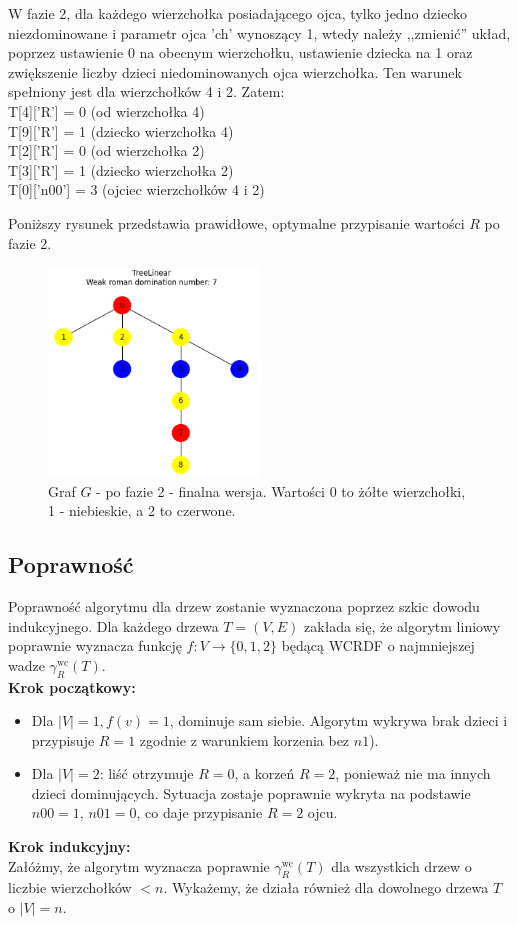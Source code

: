 W fazie 2, dla każdego wierzchołka posiadającego ojca, tylko jedno dziecko niezdominowane i parametr ojca 'ch' wynoszący 1, wtedy należy ,,zmienić'' układ, poprzez ustawienie 0 na obecnym wierzchołku, ustawienie dziecka na 1 oraz zwiększenie liczby dzieci niedominowanych ojca wierzchołka. 
Ten warunek spełniony jest dla wierzchołków 4 i 2. Zatem:\\
T[4]['R'] = 0  (od wierzchołka 4)\\
T[9]['R'] = 1  (dziecko wierzchołka 4)\\
T[2]['R'] = 0  (od wierzchołka 2)\\
T[3]['R'] = 1  (dziecko wierzchołka 2)\\
T[0]['n00'] = 3  (ojciec wierzchołków 4 i 2)

Poniższy rysunek przedstawia prawidłowe, optymalne przypisanie wartości $R$ po fazie 2.\\

\begin{figure}[H]
    \centering
    \includegraphics[width=0.5\textwidth]{assets/phase2.png}
    \caption{Graf $G$ - po fazie 2 - finalna wersja. Wartości 0 to żółte wierzchołki, 1 - niebieskie, a 2 to czerwone.}
    \label{fig:drzewoFaza2}
\end{figure}

\subsection{Poprawność}

Poprawność algorytmu dla drzew zostanie wyznaczona poprzez szkic dowodu indukcyjnego. Dla każdego drzewa $T = (V, E)$ zakłada się, że algorytm liniowy poprawnie wyznacza funkcję $f : V \to \{0,1,2\}$ będącą WCRDF o najmniejszej wadze $\gamma_R^{\text{wc}}(T)$.\\
\textbf{Krok początkowy:}
\begin{itemize}
    \item Dla $|V| = 1, f(v)= 1 $, dominuje sam siebie. Algorytm wykrywa brak dzieci i przypisuje $R = 1$ zgodnie z warunkiem korzenia bez $n1$).
    \item Dla $|V| = 2$: liść otrzymuje $R = 0$, a korzeń $R = 2$, ponieważ nie ma innych dzieci dominujących. Sytuacja zostaje poprawnie wykryta na podstawie $n00 = 1$, $n01 = 0$, co daje przypisanie $R=2$ ojcu. 
\end{itemize}
\textbf{Krok indukcyjny:}\\ 
Załóżmy, że algorytm wyznacza poprawnie $\gamma_R^{\text{wc}}(T)$ dla wszystkich drzew o liczbie wierzchołków $< n$. Wykażemy, że działa również dla dowolnego drzewa $T$ o $|V| = n$.

